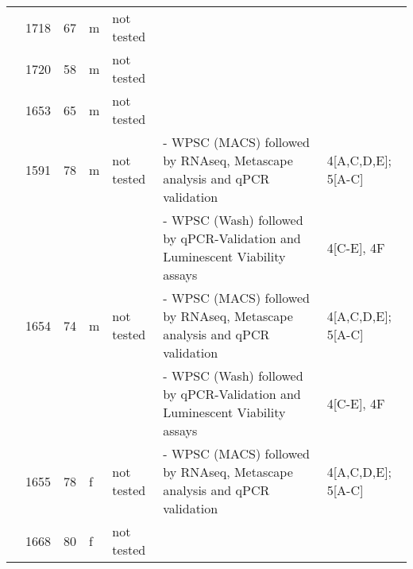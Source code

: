 {\begin{longtable}{|p{1.5cm}|p{1cm}|p{1cm}|p{1cm}|p{2cm}|p{6cm}|p{1.7cm}|}
                           & 1718                  & 67                  & m                  & not tested                                &                                                                                                          &                    \\
                           & 1720                  & 58                  & m                  & not tested                                &                                                                                                          &                    \\
                           & 1653                  & 65                  & m                  & not tested                                &                                                                                                          &                    \\
                           & 1591                  & 78                  & m                  & not tested                                & - WPSC (MACS) followed by RNAseq, Metascape analysis and qPCR validation                                 & 4[A,C,D,E]; 5[A-C] \\
                           &                       &                     &                    &                                           & - WPSC (Wash) followed by qPCR-Validation and Luminescent Viability assays                               & 4[C-E], 4F         \\
                           & 1654                  & 74                  & m                  & not tested                                & - WPSC (MACS) followed by RNAseq, Metascape analysis and qPCR validation                                 & 4[A,C,D,E]; 5[A-C] \\
                           &                       &                     &                    &                                           & - WPSC (Wash) followed by qPCR-Validation and Luminescent Viability assays                               & 4[C-E], 4F         \\
                           & 1655                  & 78                  & f                  & not tested                                & - WPSC (MACS) followed by RNAseq, Metascape analysis and qPCR validation                                 & 4[A,C,D,E]; 5[A-C] \\
                           & 1668                  & 80                  & f                  & not tested                                &                                                                                                          &                    \\

\end{longtable}}

